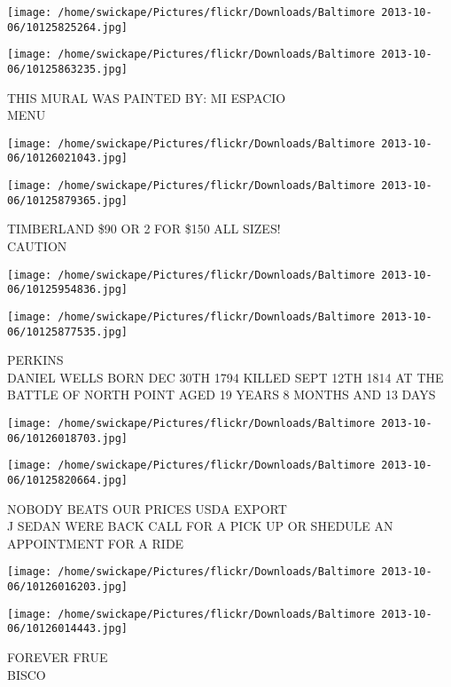 \documentclass[10pt,letterpaper]{article}
\begin{document}
\texttt{[image: /home/swickape/Pictures/flickr/Downloads/Baltimore 2013-10-06/10125825264.jpg]}

\vspace{0.25in}
\texttt{[image: /home/swickape/Pictures/flickr/Downloads/Baltimore 2013-10-06/10125863235.jpg]}

THIS MURAL WAS PAINTED BY: MI ESPACIO\\
MENU
\pagebreak

\texttt{[image: /home/swickape/Pictures/flickr/Downloads/Baltimore 2013-10-06/10126021043.jpg]}

\vspace{0.25in}
\texttt{[image: /home/swickape/Pictures/flickr/Downloads/Baltimore 2013-10-06/10125879365.jpg]}

TIMBERLAND \$90 OR 2 FOR \$150 ALL SIZES!\\
CAUTION
\pagebreak

\texttt{[image: /home/swickape/Pictures/flickr/Downloads/Baltimore 2013-10-06/10125954836.jpg]}

\vspace{0.25in}
\texttt{[image: /home/swickape/Pictures/flickr/Downloads/Baltimore 2013-10-06/10125877535.jpg]}

PERKINS\\
DANIEL WELLS BORN DEC 30TH 1794 KILLED SEPT 12TH 1814 AT THE BATTLE OF NORTH POINT AGED 19 YEARS 8 MONTHS AND 13 DAYS
\pagebreak

\texttt{[image: /home/swickape/Pictures/flickr/Downloads/Baltimore 2013-10-06/10126018703.jpg]}

\vspace{0.25in}
\texttt{[image: /home/swickape/Pictures/flickr/Downloads/Baltimore 2013-10-06/10125820664.jpg]}

NOBODY BEATS OUR PRICES USDA EXPORT\\
J SEDAN WERE BACK CALL FOR A PICK UP OR SHEDULE AN APPOINTMENT FOR A RIDE
\pagebreak

\texttt{[image: /home/swickape/Pictures/flickr/Downloads/Baltimore 2013-10-06/10126016203.jpg]}

\vspace{0.25in}
\texttt{[image: /home/swickape/Pictures/flickr/Downloads/Baltimore 2013-10-06/10126014443.jpg]}

FOREVER FRUE\\
BISCO
\pagebreak
\end{document}
